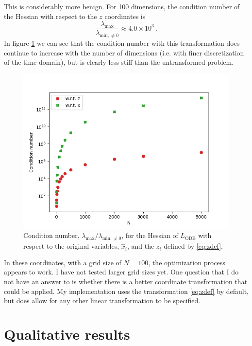 \documentclass{article}
\begin{document}
This is considerably more benign. For 100 dimensions, the condition number of the Hessian with respect to the $z$ coordinates is
$$
\frac{\lambda_{\mathrm{max}}}{\lambda_{\mathrm{min}, \ne 0}} \approx 4.0 \times 10^3 \,.
$$
In figure \ref{fig:condition_numbers} we can see that the condition number with this transformation does continue to increase with the number of dimensions (i.e. with finer discretization of the time domain), but is clearly less stiff than the untransformed problem.

\begin{figure}
\includegraphics{images/method/condition_numbers.png}
\centering
\caption{
Condition number, $\lambda_{\mathrm{max}} / \lambda_{\mathrm{min}, \ne 0}$, for the Hessian of $L_{\mathrm{ODE}}$ with respect to the original variables, $\hat{x}_i$, and the $z_i$ defined by \eqref{eq:zdef}.
}
\label{fig:condition_numbers}
\end{figure}

In these coordinates, with a grid size of $N=100$, the optimization process appears to work.
I have not tested larger grid sizes yet.
One question that I do not have an answer to is whether there is a better coordinate transformation that could be applied.
My implementation uses the transformation \eqref{eq:zdef} by default, but does allow for any other linear transformation to be specified.

\section{Qualitative results}
\label{sec:qual_results}
\end{document}
